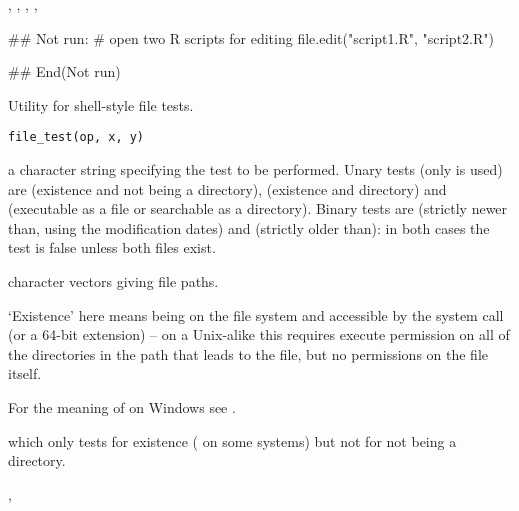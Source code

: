 %
\begin{SeeAlso}\relax
{},
,
,
,
\end{SeeAlso}
%
\begin{Examples}
\begin{ExampleCode}
## Not run: 
# open two R scripts for editing
file.edit("script1.R", "script2.R")

## End(Not run)
\end{ExampleCode}
\end{Examples}
%
\begin{Description}\relax
Utility for shell-style file tests.
\end{Description}
%
\begin{Usage}
\begin{verbatim}
file_test(op, x, y)
\end{verbatim}
\end{Usage}
%
\begin{Arguments}
\begin{ldescription}
\item[\code{op}] a character string specifying the test to be performed.
Unary tests (only  is used) are  (existence and
not being a directory),  (existence and directory) and
 (executable as a file or searchable as a directory). 
Binary tests are  (strictly newer than, using the modification
dates) and  (strictly older than): in both cases the
test is false unless both files exist.
\item[\code{x,y}] character vectors giving file paths.
\end{ldescription}
\end{Arguments}
%
\begin{Details}\relax
`Existence' here means being on the file system and accessible
by the  system call (or a 64-bit extension) -- on a
Unix-alike this requires execute permission on all of the directories in
the path that leads to the file, but no permissions on the file
itself.

For the meaning of  on Windows see .
\end{Details}
%
\begin{SeeAlso}\relax
{} which only tests for existence
( on some systems) but not for not being a directory.

, 
\end{SeeAlso}
